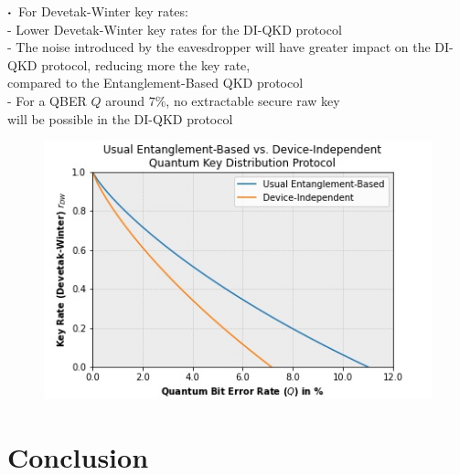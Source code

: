 \documentclass{beamer}
\newcommand\sbullet[1][.5]{\mathbin{\vcenter{\hbox{\scalebox{#1}{$\bullet$}}}}}
\begin{document}
\begin{frame}
\begin{minipage}{0.5\textwidth}
\begin{figure}
                    \vspace{-4ex}
                \caption{\color{blue}{Figure 3: }\color{black}{Holevo bounds with respect to QBER $Q$}}
                \end{figure}
            \end{minipage}%
            \begin{minipage}{0.5\textwidth}
                \centering
                \vspace{0.5ex}
                \scriptsize $\sbullet$\, For Devetak-Winter key rates:\\
                \vspace{0.25ex}
                \tiny
                - Lower Devetak-Winter key rates for the DI-QKD protocol\\
                - The noise introduced by the eavesdropper will have greater impact on the DI-QKD protocol, reducing more the key rate,\\ compared to the Entanglement-Based QKD protocol\\
                - For a QBER $Q$ around $7\%$, no extractable secure raw key\\ will be possible in the DI-QKD protocol
                \vspace{-1.2ex}
                \begin{figure}
                    \includegraphics[width=\linewidth]{figures/jpg/key-rates-bounds-plot.jpg}
                    \vspace{-4ex}
                    \caption{\color{blue}{Figure 4: }\color{black}{Devetak-Winter key rates with respect to QBER $Q$}}
                \end{figure}
            \end{minipage}
            
		\end{frame}

    \section{Conclusion}
\end{document}
